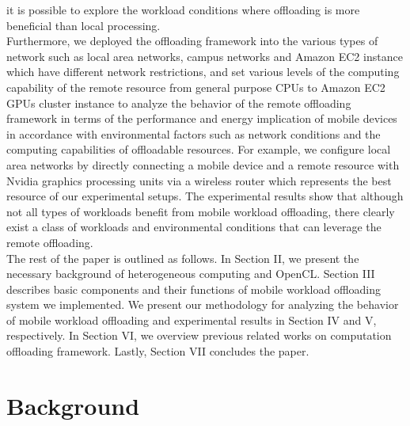\documentclass[conference]{IEEEtran}
\begin{document}
it is possible to explore the workload conditions where offloading is
more beneficial than local processing.\\    
%
\indent Furthermore, we deployed the offloading framework into the
various types of network such as local area networks, campus networks
and Amazon EC2 instance which have different network restrictions, and
set various levels of the computing capability of the remote
resource from general purpose CPUs to Amazon EC2 GPUs cluster instance to
analyze the behavior of the remote offloading framework in terms of the
performance and energy implication of mobile devices in accordance with
environmental factors such as network conditions and the computing
capabilities of offloadable resources.
%
For example, we configure local area networks by directly connecting a
mobile device and a remote resource with Nvidia graphics processing
units via a wireless router which represents the best resource of our
experimental setups.
%
The experimental results show that although not all types of workloads
benefit from mobile workload offloading, there clearly exist a class of
workloads and environmental conditions that can leverage the remote
offloading.\\
%
\indent The rest of the paper is outlined as follows. In Section II, we
present the necessary background of heterogeneous computing and OpenCL. 
%
Section III describes basic components and their functions of mobile
workload offloading system we implemented.
%
We present our methodology for analyzing the behavior of mobile workload
offloading and experimental results in Section IV and V, respectively.
%
In Section VI, we overview previous related works on computation
offloading framework.
%
Lastly, Section VII concludes the paper.
%
\section{Background}
\end{document}
